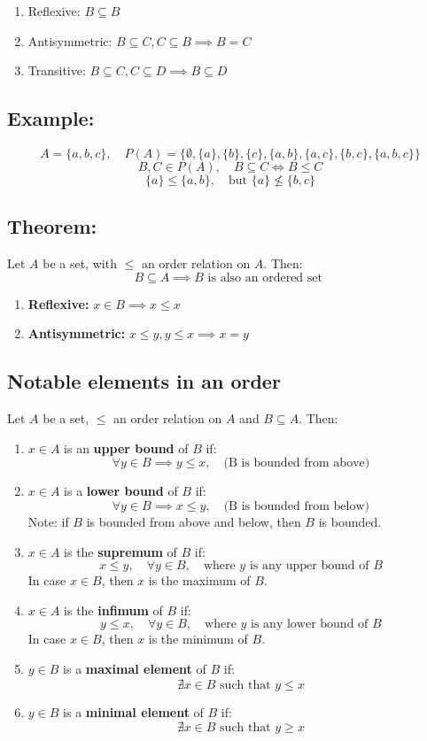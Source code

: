 \documentclass[11pt]{article}
\begin{document}
\begin{enumerate}
    \item Reflexive: $B \subseteq B$
    \item Antisymmetric: $B \subseteq C, C \subseteq B \implies B = C$
    \item Transitive: $B \subseteq C, C \subseteq D \implies B \subseteq D$
\end{enumerate}

\subsection*{Example:}
\[
A = \{a,b,c\}, \quad P(A) = \{\emptyset, \{a\}, \{b\}, \{c\}, \{a,b\}, \{a,c\}, \{b,c\}, \{a,b,c\}\}
\]
\[
B, C \in P(A), \quad B \subseteq C \Longleftrightarrow B \leq C
\]
\[
\{a\} \leq \{a,b\}, \quad \text{but } \{a\} \nleq \{b,c\}
\]

\subsection{Theorem:}
Let $A$ be a set, with $\leq$ an order relation on $A$. Then:
\[
B \subseteq A \implies B \text{ is also an ordered set }
\]

\begin{enumerate}
    \item \textbf{Reflexive:} $x \in B \implies x \leq x$
    \item \textbf{Antisymmetric:} $x \leq y, y \leq x \implies x = y$
\end{enumerate}

\subsection{Notable elements in an order}
Let $A$ be a set, $\leq$ an order relation on $A$ and $B \subseteq A$. Then:
\begin{enumerate}
    \item $x \in A$ is an \textbf{upper bound} of $B$ if:
    \[
    \forall y \in B \implies y \leq x, \quad \text{(B is bounded from above)}
    \]
    \item $x \in A$ is a \textbf{lower bound} of $B$ if:
    \[
    \forall y \in B \implies x \leq y, \quad \text{(B is bounded from below)}
    \]
    Note: if $B$ is bounded from above and below, then $B$ is bounded.
    \item $x \in A$ is the \textbf{supremum} of $B$ if:
    \[
    x \leq y, \quad \forall y \in B, \quad \text{where } y \text{ is any upper bound of } B
    \]
    In case $x \in B$, then $x$ is the maximum of $B$.
    \item $x \in A$ is the \textbf{infimum} of $B$ if:
    \[
    y \leq x, \quad \forall y \in B, \quad \text{where } y \text{ is any lower bound of } B
    \]
    In case $x \in B$, then $x$ is the minimum of $B$.
    \item $y \in B$ is a \textbf{maximal element} of $B$ if:
    \[
    \nexists x \in B \text{ such that } y \leq x
    \]
    \item $y \in B$ is a \textbf{minimal element} of $B$ if:
    \[
    \nexists x \in B \text{ such that } y \geq x
    \]
\end{enumerate}
\end{document}
